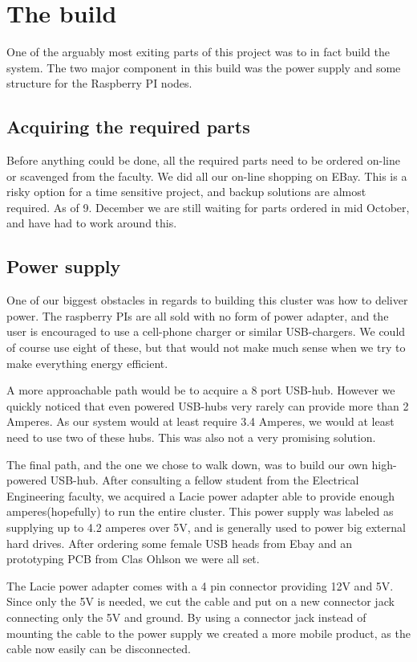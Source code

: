 \clearpage
\section{The build}
\label{sec:build}
One of the arguably most exiting parts of this project was to in fact build the system. The two major component in this build was the power supply and some structure for the Raspberry PI nodes. 

\subsection{Acquiring the required parts}
Before anything could be done, all the required parts need to be ordered on-line or scavenged from the faculty. We did all our on-line shopping on EBay. This is a risky option for a time sensitive project, and backup solutions are almost required. As of 9. December we are still waiting for parts  ordered in mid October, and have had to work around this.  

\subsection{Power supply}
One of our biggest obstacles in regards to building this cluster was how to deliver power. The raspberry PIs are all sold with no form of power adapter, and the user is encouraged to use a cell-phone charger or similar USB-chargers. We could of course use eight of these, but that would not make much sense when we try to make everything energy efficient. 

A more approachable path would be to acquire a 8 port USB-hub. However we quickly noticed that even powered USB-hubs very rarely can provide more than 2 Amperes. As our system would at least require 3.4 Amperes, we would at least need to use two of these hubs. This was also not a very promising solution.

The final path, and the one we chose to walk down, was to build our own high-powered USB-hub. After consulting a fellow student from the Electrical Engineering faculty, we acquired a Lacie power adapter able to provide enough amperes(hopefully) to run the entire cluster. This power supply was labeled as supplying up to 4.2 amperes over 5V, and is generally used to power big external hard drives. After ordering some female USB heads from Ebay and an prototyping PCB from Clas Ohlson we were all set. 

The Lacie power adapter comes with a 4 pin connector providing 12V and 5V. Since only the 5V is needed, we cut the cable and put on a new connector jack connecting only the 5V and ground. By using a connector jack instead of mounting the cable to the power supply we created a more mobile product, as the cable now easily can be disconnected.

